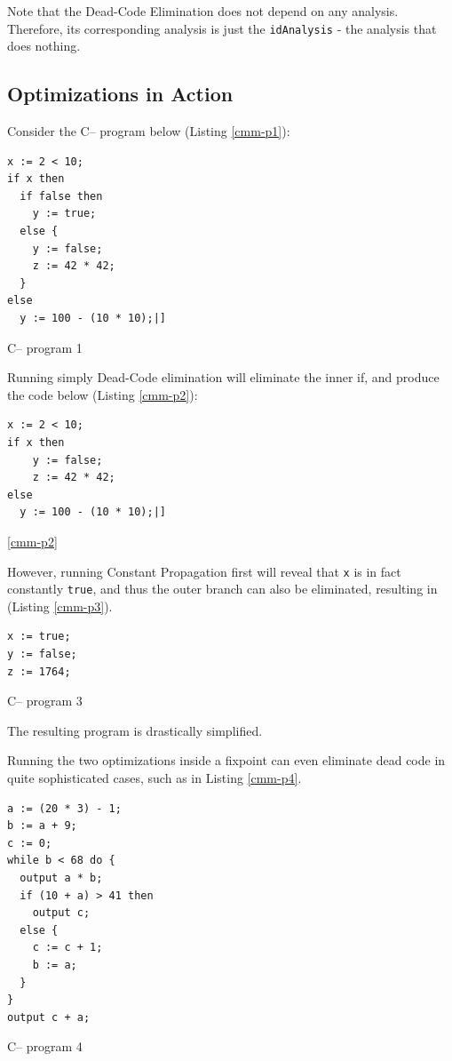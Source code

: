 \documentclass{article}
\begin{document}
Note that the Dead-Code Elimination does not depend on any analysis.
Therefore, its corresponding analysis is just the \texttt{idAnalysis} -
the analysis that does nothing.

\subsection{Optimizations in Action}\label{optimizations-in-action}

Consider the C-- program below (Listing \ref{cmm-p1}):

\begin{listing}[H]
\begin{verbatim}
x := 2 < 10;
if x then
  if false then
    y := true;
  else {
    y := false;
    z := 42 * 42;
  }
else
  y := 100 - (10 * 10);|]
\end{verbatim}
\caption{C-- program 1}
\label{cmm-p1}
\end{listing}

Running simply Dead-Code elimination will eliminate the inner if, and
produce the code below (Listing \ref{cmm-p2}):

\begin{listing}[H]
\begin{verbatim}
x := 2 < 10;
if x then
    y := false;
    z := 42 * 42;
else
  y := 100 - (10 * 10);|]
\end{verbatim}
\ref{cmm-p2}
\label{C-- program 2}
\end{listing}

However, running Constant Propagation first will reveal that \texttt{x}
is in fact constantly \texttt{true}, and thus the outer branch can also
be eliminated, resulting in (Listing \ref{cmm-p3}).

\begin{listing}[H]
\begin{verbatim}
x := true;
y := false;
z := 1764;
\end{verbatim}
\caption{C-- program 3}
\label{cmm-p3}
\end{listing}

The resulting program is drastically simplified.

Running the two optimizations inside a fixpoint can even eliminate dead
code in quite sophisticated cases, such as in Listing \ref{cmm-p4}.

\begin{listing}[H]
\begin{verbatim}
a := (20 * 3) - 1;
b := a + 9;
c := 0;
while b < 68 do {
  output a * b;
  if (10 + a) > 41 then
    output c;
  else {
    c := c + 1;
    b := a;
  }
}
output c + a;
\end{verbatim}
\caption{C-- program 4}
\label{cmm-p4}
\end{listing}
\end{document}
